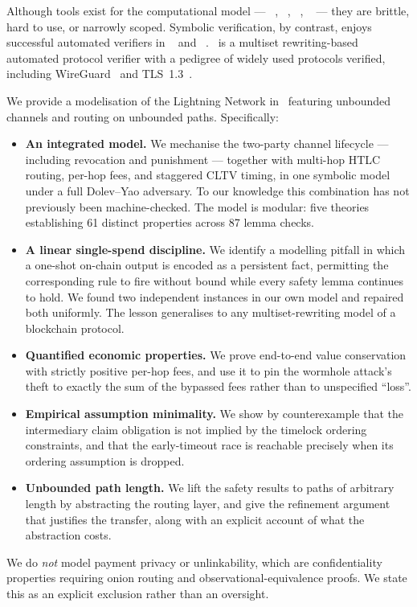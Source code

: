 Although tools exist for the computational model ---
\mcryptoverif~\cite{blanchet2006computationally},
\measycrypt~\cite{barthe2011computer},
\msquirrel~\cite{baelde2021interactive},
\mcryptovampire~\cite{jeanteur2024cryptovampire} --- they are brittle, hard to
use, or narrowly scoped. Symbolic verification, by contrast, enjoys successful
automated verifiers in \mproverif~\cite{blanchet2001efficient} and
\mtamarin~\cite{meier2013tamarin}. \mtamarin\ is a multiset rewriting-based
automated protocol verifier with a pedigree of widely used protocols verified,
including WireGuard~\cite{lipp2019mechanised} and
TLS~1.3~\cite{cremers2017comprehensive}.

We provide a modelisation of the Lightning Network in \mtamarin\ featuring
unbounded channels and routing on unbounded paths. Specifically:

\begin{itemize}
  \item \textbf{An integrated model.} We mechanise the two-party channel
  lifecycle --- including revocation and punishment --- together with multi-hop
  HTLC routing, per-hop fees, and staggered CLTV timing, in one symbolic model
  under a full Dolev--Yao adversary. To our knowledge this combination has not
  previously been machine-checked. The model is modular: five theories
  establishing 61 distinct properties across 87 lemma checks.

  \item \textbf{A linear single-spend discipline.} We identify a modelling
  pitfall in which a one-shot on-chain output is encoded as a persistent fact,
  permitting the corresponding rule to fire without bound while every safety
  lemma continues to hold. We found two independent instances in our own model
  and repaired both uniformly. The lesson generalises to any
  multiset-rewriting model of a blockchain protocol.

  \item \textbf{Quantified economic properties.} We prove end-to-end value
  conservation with strictly positive per-hop fees, and use it to pin the
  wormhole attack's theft to exactly the sum of the bypassed fees rather than
  to unspecified ``loss''.

  \item \textbf{Empirical assumption minimality.} We show by counterexample
  that the intermediary claim obligation is not implied by the timelock
  ordering constraints, and that the early-timeout race is reachable precisely
  when its ordering assumption is dropped.

  \item \textbf{Unbounded path length.} We lift the safety results to paths of
  arbitrary length by abstracting the routing layer, and give the refinement
  argument that justifies the transfer, along with an explicit account of what
  the abstraction costs.
\end{itemize}

We do \emph{not} model payment privacy or unlinkability, which are
confidentiality properties requiring onion routing and
observational-equivalence proofs. We state this as an explicit exclusion rather
than an oversight.
